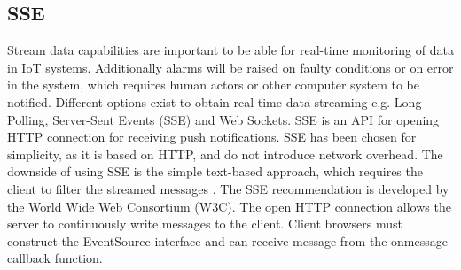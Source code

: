 \subsection{SSE}
Stream data capabilities are important to be able for real-time monitoring of data in IoT systems. Additionally alarms will be raised on faulty conditions or on error in the system, which requires human actors or other computer system to be notified. Different options exist to obtain real-time data streaming e.g. Long Polling, Server-Sent Events (SSE) and Web Sockets. SSE is an API for opening HTTP connection for receiving push notifications. SSE has been chosen for simplicity, as it is based on HTTP, and do not introduce network overhead. The downside of using SSE is the simple text-based approach, which requires the client to filter the streamed messages \cite{evalSSE}. The SSE recommendation \cite{W3C} is developed by the World Wide Web Consortium (W3C). The open HTTP connection allows the server to continuously write messages to the client. Client browsers must construct the EventSource interface and can receive message from the onmessage callback function.